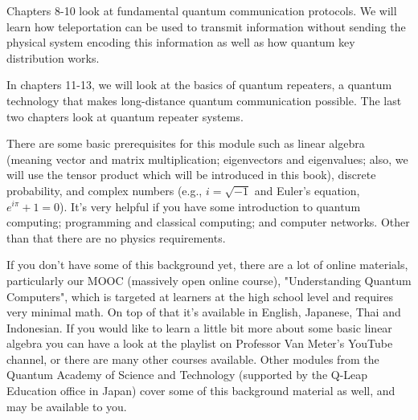 Chapters 8-10 look at fundamental quantum communication protocols.
We will learn how teleportation can be used to transmit information without sending the physical system encoding this information as well as how quantum key distribution works.

In chapters 11-13, we will look at the basics of quantum repeaters, a quantum technology that makes long-distance quantum communication possible.
The last two chapters look at quantum repeater systems.

There are some basic prerequisites for this module such as linear algebra (meaning vector and matrix multiplication; eigenvectors and eigenvalues; also, we will use the tensor product which will be introduced in this book), discrete probability, and complex numbers (e.g., $i = \sqrt{-1}$ and Euler's equation, $e^{i\pi} + 1 = 0$). It's very helpful if you have some introduction to quantum computing; programming and classical computing; and computer networks.
Other than that there are no physics requirements.

If you don't have some of this background yet, there are a lot of online materials, particularly our MOOC (massively open online course), "Understanding Quantum Computers", which is targeted at learners at the high school level and requires very minimal math.
On top of that it's available in English, Japanese, Thai and Indonesian.
If you would like to learn a little bit more about some basic linear algebra you can have a look at the playlist on Professor Van Meter's YouTube channel, or there are many other courses available. Other modules from the Quantum Academy of Science and Technology (supported by the Q-Leap Education office in Japan) cover some of this background material as well, and may be available to you.





